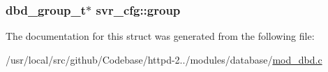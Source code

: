 \subsubsection[{\texorpdfstring{group}{group}}]{\setlength{\rightskip}{0pt plus 5cm}dbd\+\_\+group\+\_\+t$\ast$ svr\+\_\+cfg\+::group}\hypertarget{structsvr__cfg_a72be9dba59243d9504d144dc9d63f56a}{}\label{structsvr__cfg_a72be9dba59243d9504d144dc9d63f56a}


The documentation for this struct was generated from the following file\+:\begin{DoxyCompactItemize}
\item 
/usr/local/src/github/\+Codebase/httpd-\/2../modules/database/\hyperlink{mod__dbd_8c}{mod\+\_\+dbd.\+c}\end{DoxyCompactItemize}
